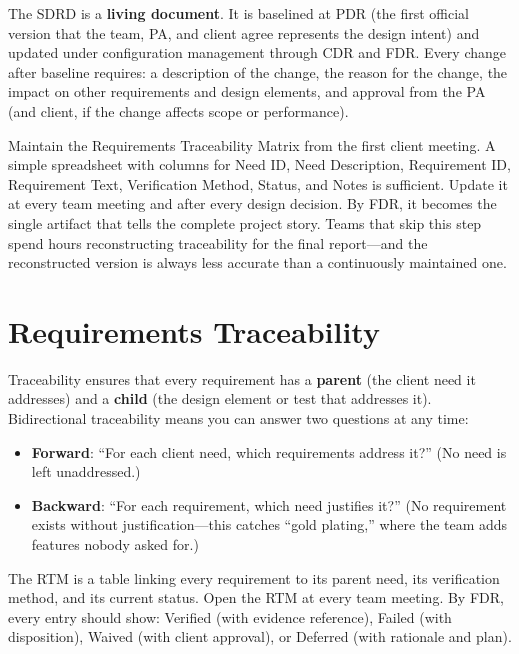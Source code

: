 The SDRD is a \textbf{living document}. It is baselined at PDR (the first official version that the team, PA, and client agree represents the design intent) and updated under configuration management through CDR and FDR. Every change after baseline requires: a description of the change, the reason for the change, the impact on other requirements and design elements, and approval from the PA (and client, if the change affects scope or performance).

\begin{tipbox}
Maintain the Requirements Traceability Matrix from the first client meeting. A simple spreadsheet with columns for Need ID, Need Description, Requirement ID, Requirement Text, Verification Method, Status, and Notes is sufficient. Update it at every team meeting and after every design decision. By FDR, it becomes the single artifact that tells the complete project story. Teams that skip this step spend hours reconstructing traceability for the final report---and the reconstructed version is always less accurate than a continuously maintained one.
\end{tipbox}

\section{Requirements Traceability}
Traceability ensures that every requirement has a \textbf{parent} (the client need it addresses) and a \textbf{child} (the design element or test that addresses it). Bidirectional traceability means you can answer two questions at any time:
\begin{itemize}[nosep,leftmargin=1.5em]
\item \textbf{Forward}: ``For each client need, which requirements address it?'' (No need is left unaddressed.)
\item \textbf{Backward}: ``For each requirement, which need justifies it?'' (No requirement exists without justification---this catches ``gold plating,'' where the team adds features nobody asked for.)
\end{itemize}

The RTM is a table linking every requirement to its parent need, its verification method, and its current status. Open the RTM at every team meeting. By FDR, every entry should show: Verified (with evidence reference), Failed (with disposition), Waived (with client approval), or Deferred (with rationale and plan).

